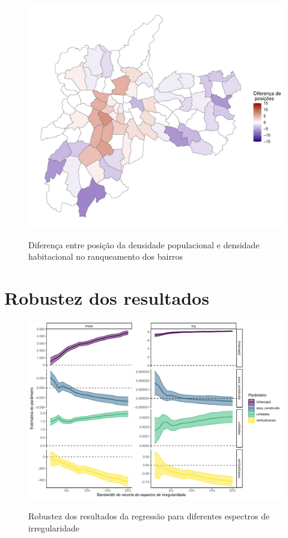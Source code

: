 \begin{apendicesenv}
\begin{figure}[!h]
    \centering
    \caption{Diferença entre posição da densidade populacional e densidade habitacional no ranqueamento dos bairros}
    \includegraphics[width = \linewidth]{figuras/bairros-mapa-cotaparte.pdf}
    \label{fig:bairros-mapa-CP}
\end{figure}





\chapter{Robustez dos resultados}
\label{appendix:robustez}

\begin{figure}[!h]
    \centering
    \caption{Robustez dos resultados da regressão para diferentes espectros de irregularidade}
    \includegraphics[width = \linewidth]{figuras/robustez-regressao1pop.pdf}
    \label{fig:robustez-reg1}
\end{figure}



\end{apendicesenv}
